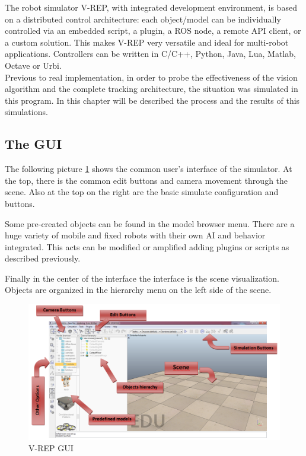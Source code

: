 The robot simulator V-REP, with integrated development environment, is based on a distributed control architecture: each object/model can be individually controlled via an embedded script, a plugin, a ROS node, a remote API client, or a custom solution. This makes V-REP very versatile and ideal for multi-robot applications. Controllers can be written in C/C++, Python, Java, Lua, Matlab, Octave or Urbi. \\

Previous to real implementation, in order to probe the effectiveness of the vision algorithm and the complete tracking architecture, the situation was simulated in this program. In this chapter will be described the process and the results of this simulations.

\subsection{The GUI}

The following picture \ref{fig:VREP_GUI} shows the common user's interface of the simulator. At the top, there is the common edit buttons and camera movement through the scene. Also at the top on the right are the basic simulate configuration and buttons.

Some pre-created objects can be found in the model browser menu. There are a huge variety of mobile and fixed robots with their own AI and behavior integrated. This acts can be modified or amplified adding plugins or scripts as described previously.

Finally in the center of the interface the interface is the scene visualization. Objects are organized in the hierarchy menu on the left side of the scene.

\begin{figure}
	\includegraphics[width=\textwidth,natwidth=964,natheight=520]{../Images/c3/vrep_main.png}
	\caption{V-REP GUI}
	\label{fig:VREP_GUI}
\end{figure}


